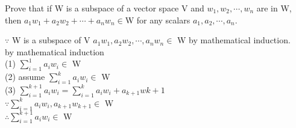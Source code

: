 Prove that if W is a subspace of a vector space V and $w_1,w_2,\cdots,w_n$ are in W, then $a_1w_1+a_2w_2+\cdots+a_nw_n \in $W for any scalars $a_1,a_2,\cdots,a_n$.

\begin{tcolorbox}
	\begin{solution} $ $\\
		$\because$ W is a subspace of V
		$a_1w_1,a_2w_2,\cdots,a_nw_n \in$ W by mathematical induction.\\
		by mathematical induction\\
		(1) $\sum^1_{i=1}a_iw_i \in$ W\\
		(2) assume $\sum^k_{i=1}a_iw_i \in $ W\\
		(3) $\sum^{k+1}_{i=1}a_iw_i = \sum^{k}_{i=1}a_iw_i + a_{k+1}w{k+1} $\\
		$\because \sum^{k}_{i=1}a_iw_i , a_{k+1}w_{k+1} \in $ W\\
		$\therefore \sum^{k+1}_{i=1}a_iw_i \in $ W
	\end{solution}
\end{tcolorbox}